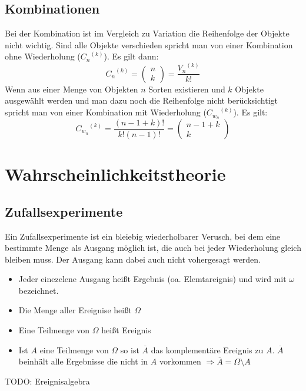 \documentclass[a4paper]{scrartcl}
\begin{document}
        \subsection{Kombinationen}
            Bei der Kombination ist im Vergleich zu Variation die Reihenfolge der Objekte nicht wichtig. Sind alle Objekte verschieden spricht man 
            von einer Kombination ohne Wiederholung (\({C_n}^{(k)}\)). Es gilt dann:
            \begin{equation*}
                {C_n}^{(k)} = \begin{pmatrix}
                                n \\ k 
                              \end{pmatrix}
                                                  = \frac{{V_n}^{(k)}}{k!}
            \end{equation*}
            Wenn aus einer Menge von Objekten \(n\) Sorten existieren und \(k\) Objekte ausgewählt werden und man dazu noch die Reihenfolge nicht berücksichtigt 
            spricht man von einer Kombination mit Wiederholung (\( {C_{w_n}}^{(k)} \)). Es gilt:
            \begin{equation*}
                {C_{w_n}}^{(k)} = \frac{(n-1+k)!}{k!(n-1)!} = \begin{pmatrix} n-1 + k \\ k  \end{pmatrix}
            \end{equation*}

    \section{Wahrscheinlichkeitstheorie}
        \subsection{Zufallsexperimente}
            Ein Zufallsexperimente ist ein bleiebig wiederholbarer Verusch, bei dem eine bestimmte Menge als Ausgang möglich ist, die auch bei jeder Wiederholung gleich bleiben muss.
            Der Ausgang kann dabei auch nicht vohergesagt werden.
            \begin{itemize}
                \item Jeder einezelene Ausgang heißt Ergebnis (oa. Elemtareignis) und wird mit \(\omega\) bezeichnet.
                \item Die Menge aller Ereignise heißt \(\Omega\)
                \item Eine Teilmenge von \(\Omega\) heißt Ereignis
                \item Ist \(A\) eine Teilmenge von \(\Omega\) so ist \(\overline{A}\) das komplementäre Ereignis zu \(A\). \(\overline{A}\) beinhält alle Ergebnisse die nicht in \(A\)
                    vorkommen \(\Rightarrow \overline{A} = \Omega \setminus A\)
            \end{itemize}  
            TODO: Ereignisalgebra
\end{document}
